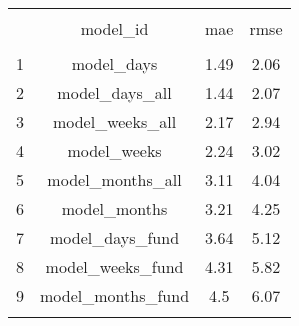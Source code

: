 
\begin{table}[!htbp] \centering 
  \caption{} 
  \label{} 
\begin{tabular}{@{\extracolsep{5pt}} cccc} 
\\[-1.8ex]\hline 
\hline \\[-1.8ex] 
 & model\_id & mae & rmse \\ 
\hline \\[-1.8ex] 
1 & model\_days & 1.49 & 2.06 \\ 
2 & model\_days\_all & 1.44 & 2.07 \\ 
3 & model\_weeks\_all & 2.17 & 2.94 \\ 
4 & model\_weeks & 2.24 & 3.02 \\ 
5 & model\_months\_all & 3.11 & 4.04 \\ 
6 & model\_months & 3.21 & 4.25 \\ 
7 & model\_days\_fund & 3.64 & 5.12 \\ 
8 & model\_weeks\_fund & 4.31 & 5.82 \\ 
9 & model\_months\_fund & 4.5 & 6.07 \\ 
\hline \\[-1.8ex] 
\end{tabular} 
\end{table} 

